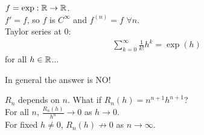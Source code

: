 \documentclass[a4paper]{article}
\begin{document}
\begin{eg}
$f=\exp:\mathbb{R} \to \mathbb{R}$.\\
$f'=f$, so $f$ is $C^\infty$ and $f^{\left(n\right)} = f$ $\forall n$.\\
Taylor series at 0:
\begin{equation*}
\begin{aligned}
\sum_{k=0}^\infty \frac{1}{k!}h^k = \exp\left(h\right)
\end{aligned}
\end{equation*}
for all $h\in\mathbb{R}$...
\end{eg}

In general the answer is NO!
\begin{prob}
$R_n$ depends on $n$. What if $R_n\left(h\right)=n^{n+1}h^{n+1}$?\\
For all $n$, $\frac{R_n\left(h\right)}{h^n}\to 0$ as $h\to 0$.\\
For fixed $h\neq 0$, $R_n\left(h\right) \not\to 0$ as $n\to \infty$.
\end{prob}
\end{document}
